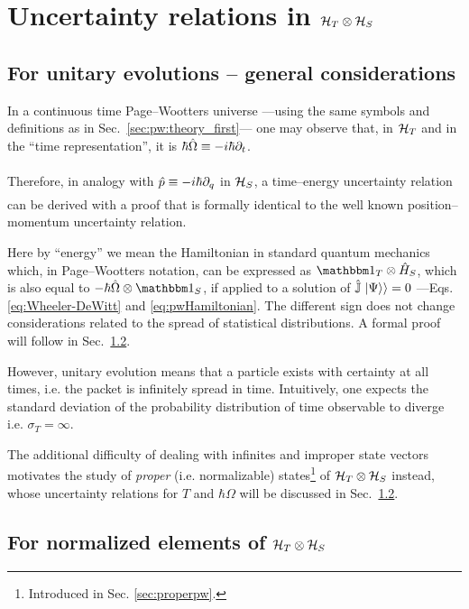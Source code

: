 \section{Uncertainty relations in $\mathcal{H}_T \otimes \mathcal{H}_S$}\label{sec:pw:uncertainty}

\subsection{For unitary evolutions -- general considerations}
\label{sec:pw:unitary-general}

In a continuous time Page--Wootters universe
---using the same symbols and definitions as in Sec.~\ref{sec:pw:theory_first}---
one may observe that,
in $\mathcal{H}_T$ and in the ``time representation'',
it is $\hbar\hat{\Omega} \underset{}{\equiv} -i\hbar\partial_{t}$.

Therefore, in analogy with $\hat{p} \underset{}{\equiv} -i\hbar\partial_{q}$ in $\mathcal{H}_S$,
a time--energy uncertainty relation can be derived
with a proof that is formally identical to the well known
position--momentum uncertainty relation.

Here by ``energy'' we mean the Hamiltonian in standard quantum mechanics which,
in Page--Wootters notation,
can be expressed as $\idop_T \ox \op{H}_S$, which is also equal to
$-\hbar\op{\Omega} \ox \idop_S$,
if applied to a solution of $\hat{\mathbb{J}}\left.\left| \Psi \right\rangle\right\rangle = 0$
---Eqs. \eqref{eq:Wheeler-DeWitt} and \eqref{eq:pwHamiltonian}.
The different sign does not change considerations related to the spread of statistical distributions.
A formal proof will follow in Sec.~\ref{sec:for-normalized-elements}.

However, unitary evolution means that a particle exists with
certainty at all times, i.e. the packet
is infinitely spread in time.
Intuitively,
one expects the standard deviation
of the probability distribution of time observable
to diverge i.e.
$\sigma_T = \infty$.

The additional difficulty of dealing with infinites and improper state vectors
motivates the study of \emph{proper} (i.e. normalizable) states\footnote{
  Introduced in Sec. \ref{sec:properpw}.
}
of $\mathcal{H}_T \otimes \mathcal{H}_S$
instead, whose uncertainty relations for $T$ and $\hbar\Omega$ will be discussed in Sec.~\ref{sec:for-normalized-elements}.

\subsection{For normalized elements of $\mathcal{H}_T \otimes \mathcal{H}_S$}\label{sec:for-normalized-elements}

